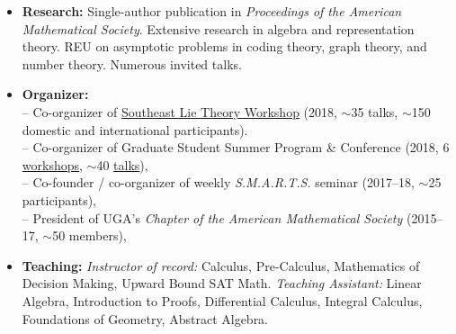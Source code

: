 \documentclass[10pt]{article}
\begin{document}
{%


\spacedhrule{0.5em}{-0.4em}

\begin{itemize}
\item \textbf{Research:} Single-author publication in \emph{Proceedings of the American Mathematical Society}. Extensive research in algebra and representation theory. REU on asymptotic problems in coding theory, graph theory, and number theory. Numerous invited talks.
\item \textbf{Organizer:}
  \\ \null \hspace{0.2em} -- Co-organizer of \href{https://www.math.lsu.edu/~pramod/selie/10/}{Southeast Lie Theory Workshop} (2018, $\sim$35 talks, $\sim$150 domestic and international participants).
  \\ \null \hspace{0.2em} -- Co-organizer of Graduate Student Summer Program \& Conference (2018, 6 \href{https://research.franklin.uga.edu/agant/professional-development-summer-2018}{workshops}, $\sim$40 \href{https://research.franklin.uga.edu/agant/mock-ams-conference-2018}{talks}),
  \\ \null \hspace{0.2em} -- Co-founder / co-organizer of weekly \emph{S.M.A.R.T.S.} seminar (2017--18, $\sim$25 participants),
  \\ \null \hspace{0.2em} -- President of UGA's \emph{Chapter of the American Mathematical Society} (2015--17, $\sim$50 members),
\item \textbf{Teaching:} \emph{Instructor of record:} Calculus, Pre-Calculus, Mathematics of Decision Making, Upward Bound SAT Math. \emph{Teaching Assistant:} Linear Algebra, Introduction to Proofs, Differential Calculus, Integral Calculus, Foundations of Geometry, Abstract Algebra.

\end{itemize}}
\end{document}
